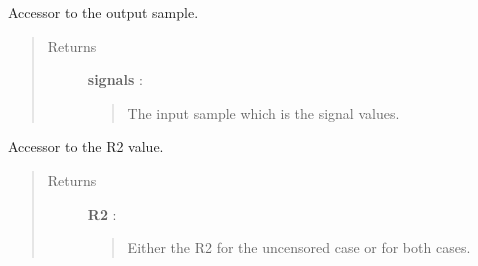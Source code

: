 \documentclass[letterpaper,10pt,english]{sphinxmanual}
\begin{document}
\begin{fulllineitems}
\begin{fulllineitems}
\end{fulllineitems}


\begin{fulllineitems}
\label{_generated/otpod.UnivariateLinearModelAnalysis:otpod.UnivariateLinearModelAnalysis.getOutputSample}
Accessor to the output sample.
\begin{quote}\begin{description}
\item[{Returns}] \leavevmode
\textbf{signals} : \href{http://doc.openturns.org/openturns-latest/sphinx/user\_manual/\_generated/openturns.NumericalSample.html\#openturns.NumericalSample}{}
\begin{quote}

The input sample which is the signal values.
\end{quote}

\end{description}\end{quote}

\end{fulllineitems}


\begin{fulllineitems}
\label{_generated/otpod.UnivariateLinearModelAnalysis:otpod.UnivariateLinearModelAnalysis.getR2}
Accessor to the R2 value.
\begin{quote}\begin{description}
\item[{Returns}] \leavevmode
\textbf{R2} : \href{http://doc.openturns.org/openturns-latest/sphinx/user\_manual/\_generated/openturns.NumericalPoint.html\#openturns.NumericalPoint}{}
\begin{quote}

Either the R2 for the uncensored case or for both cases.
\end{quote}

\end{description}\end{quote}

\end{fulllineitems}



\end{fulllineitems}
\end{document}
